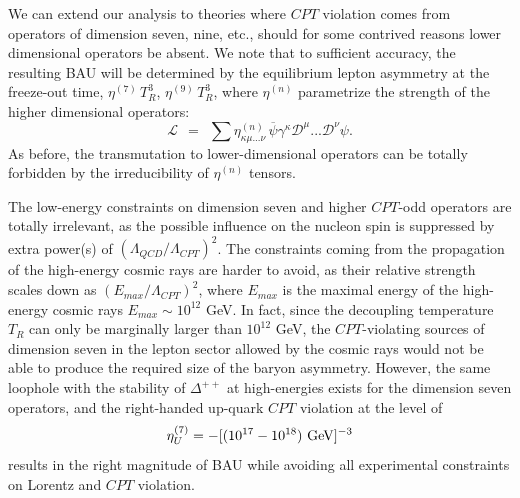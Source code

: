 \documentclass[12pt]{revtex4}
\newcommand{\eq}{{\rm eq}}
\newcommand{\mc}[1]{\mathcal{#1}}
\newcommand{\md}{\mathcal{D}}
\newcommand{\ov}{\overline}
\begin{document}
We can extend our analysis to theories where $CPT$ violation comes from operators of dimension 
seven, nine, etc., should for some contrived reasons lower dimensional operators be absent. 
	We note that to sufficient accuracy, the resulting BAU
	will be determined by the equilibrium lepton asymmetry
	at the freeze-out time, $ \eta^{(7)}\,T_R^3 $, $ \eta^{(9)}\,T_R^3 $, 
	where $\eta^{(n)}$ parametrize the strength of the higher dimensional operators:
\[
	\mc{L} ~~=~~ \sum \eta^{(n)}_{\kappa\mu...\nu}\,
	\ov{\psi} \gamma^\kappa \md^\mu ...\md^\nu  \psi.
\]
As before, the transmutation to lower-dimensional operators can be totally forbidden 
by the irreducibility of $\eta^{(n)}$ tensors. 

The low-energy constraints on dimension seven and higher $CPT$-odd operators 
are totally irrelevant, as the possible influence on the nucleon spin is 
suppressed by extra power(s) of $(\Lambda_{QCD}/\Lambda_{CPT})^2$.  The constraints 
coming from the propagation of the high-energy cosmic rays are harder to avoid, as their 
relative strength scales down as $(E_{max}/\Lambda_{CPT})^2$, where $E_{max}$ is the maximal 
energy of the high-energy cosmic rays $E_{max}\sim 10^{12}$ GeV. In fact, since the decoupling
temperature $T_R$ can only be  marginally larger than $10^{12}$ GeV, the $CPT$-violating 
sources of dimension seven in the lepton sector allowed by the cosmic rays would not 
be able to produce the required size of the baryon asymmetry. However, the same loophole 
with the stability of $\Delta^{++}$ at high-energies 
exists for the dimension seven operators, and the right-handed up-quark $CPT$ violation
at the level of 
\begin{equation}
\eta^{(7)}_U = - [(10^{17}-10^{18})~ {\rm GeV}]^{-3}
\end{equation}
results in the right magnitude of BAU while avoiding all 
experimental constraints on Lorentz and $CPT$ violation.  
\end{document}
